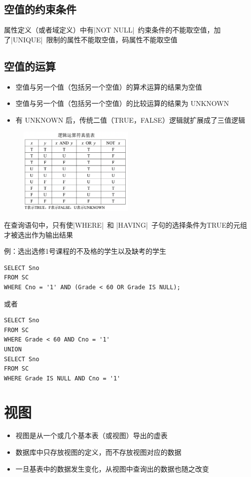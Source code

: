\subsection{空值的约束条件}
属性定义（或者域定义）中有\sverb|NOT NULL|\ 约束条件的不能取空值，加了\sverb|UNIQUE|\ 限制的属性不能取空值，码属性不能取空值

\subsection{空值的运算}
\begin{itemize}
    \item 空值与另一个值（包括另一个空值）的算术运算的结果为空值
    \item 空值与另一个值（包括另一个空值）的比较运算的结果为 UNKNOWN
    \item 有 UNKNOWN 后，传统二值（TRUE，FALSE）逻辑就扩展成了三值逻辑
\end{itemize}

\begin{figure}[H]
    \vspace{-0.5em}
	\centering
	\includegraphics[width=0.5\textwidth]{images/3.5.4}
    \vspace{-1em}
\end{figure}

在查询语句中，只有使\sverb|WHERE|\ 和 \sverb|HAVING|\ 子句的选择条件为TRUE的元组才被选出作为输出结果

例：选出选修1号课程的不及格的学生以及缺考的学生
\begin{lstlisting}
SELECT Sno
FROM SC
WHERE Cno = '1' AND (Grade < 60 OR Grade IS NULL);
\end{lstlisting}
或者
\begin{lstlisting}
SELECT Sno
FROM SC
WHERE Grade < 60 AND Cno = '1'
UNION
SELECT Sno
FROM SC
WHERE Grade IS NULL AND Cno = '1'
\end{lstlisting}

\section{视图}
\begin{itemize}
    \item 视图是从一个或几个基本表（或视图）导出的虚表
    \item 数据库中只存放视图的定义，而不存放视图对应的数据
    \item 一旦基表中的数据发生变化，从视图中查询出的数据也随之改变
\end{itemize}

